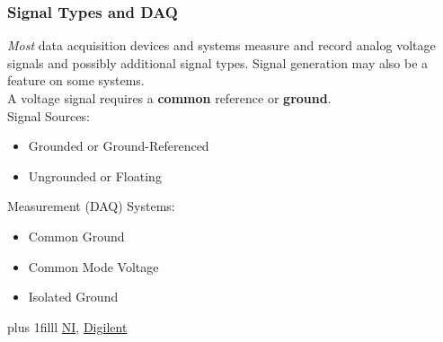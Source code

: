 \documentclass[fleqn]{beamer} %
\newcommand{\sectiontitleI}{Signal Types and DAQ}
\newcommand{\btVFill}{\vskip0pt plus 1filll}
\begin{document}
	\begin{frame}[label=sectionI] \scriptsize
	\frametitle{\sectiontitleI}
	
		{\it Most} data acquisition devices and systems measure and record {\BL analog} voltage signals and possibly additional signal types. Signal {\GR generation} may also be a feature on some systems. \vspace{5mm}\\


		A voltage signal requires a {\bf common} reference or {\bf ground}.	\vspace{2mm}\\

		Signal Sources:
		\begin{itemize}
			\item Grounded or Ground-Referenced	\vspace{2mm}\\

			\item Ungrounded or Floating \vspace{2mm}\\		

		\end{itemize}	
		\vspace*{5mm}

		Measurement (DAQ) Systems:
		\begin{itemize}
			\item Common Ground \vspace{2mm}\\

			\item Common Mode Voltage \vspace{2mm}\\

			\item Isolated Ground \vspace{2mm}\\

		\end{itemize}
		

		\btVFill
		\tiny{\href{https://www.ni.com/en/support/documentation/supplemental/06/grounding-considerations---intermediate-analog-concepts.html}{NI},}
		\tiny{\href{https://digilent.com/reference/daq-and-datalogging/documents/analog-input-signal-connections-1}{Digilent}}

	\end{frame}
\end{document}
